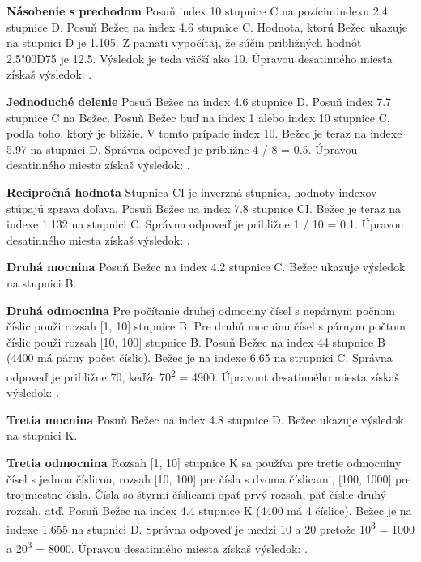 \begin{multicols*}{3}
{  \textbf{Násobenie s prechodom}
Posuň index 10 stupnice C na pozíciu indexu 2.4 stupnice D.
Posuň Bežec na index 4.6 stupnice C.
Hodnota, ktorú Bežec ukazuje na stupnici D je 1.105.
Z pamäti vypočítaj, že súčin približných hodnôt 2.5{\char"00D7}5 je 12.5.
Výsledok je teda väčší ako 10.
Úpravou desatinného miesta získaš výsledok: . 

  \textbf{Jednoduché delenie}
Posuň Bežec na index 4.6 stupnice D.
Posuň index 7.7 stupnice C na Bežec.
Posuň Bežec buď na index 1 alebo index 10 stupnice C, podľa toho, ktorý je bližšie. V tomto prípade index 10.
Bežec je teraz na indexe 5.97 na stupnici D. Správna odpoveď je približne 4 / 8 = 0.5. Úpravou desatinného miesta získaš výsledok: .

  \textbf{Recipročná hodnota}
\footnotesize Stupnica CI je inverzná stupnica, hodnoty indexov stúpajú zprava doľava. \normalsize
Posuň Bežec na index 7.8 stupnice CI.
Bežec je teraz na indexe 1.132 na stupnici C.
Správna odpoveď je približne 1 / 10 = 0.1. Úpravou desatinného miesta získaš výsledok: .

  \textbf{Druhá mocnina}
Posuň Bežec na index 4.2 stupnice C.
Bežec ukazuje výsledok  na stupnici B.

  \textbf{Druhá odmocnina}
\footnotesize Pre počítanie druhej odmociny čísel s nepárnym počnom číslic použi rozsah [1, 10] stupnice B. Pre druhú mocninu čísel s párnym počtom číslic použi rozsah [10, 100] stupnice B. \normalsize
{}
Posuň Bežec na index 44 stupnice B (4400 má párny počet číslic).
Bežec je na indexe 6.65 na strupnici C. Správna odpoveď je približne 70, keďźe 70\textsuperscript{2} = 4900. Úpravout desatinného miesta získaš výsledok: .

  \textbf{Tretia mocnina}
Posuň Bežec na index 4.8 stupnice D.
Bežec ukazuje výsledok  na stupnici K.

  \textbf{Tretia odmocnina}
\footnotesize Rozsah [1, 10] stupnice K sa používa pre tretie odmocniny čísel s jednou číslicou, rozsah [10, 100] pre čísla s dvoma číslicami, [100, 1000] pre trojmiestne čísla. Čísla so štyrmi číslicami opäť prvý rozsah, päť číslic druhý rozsah, atď. \normalsize
{}
Posuň Bežec na index 4.4 stupnice K (4400 má 4 číslice).
Bežec je na indexe 1.655 na stupnici D.
Správna odpoveď je medzi 10 a 20 pretože 10\textsuperscript{3} = 1000 a 20\textsuperscript{3} = 8000. Úpravou desatinného miesta získaš výsledok: .

}
\end{multicols*}

